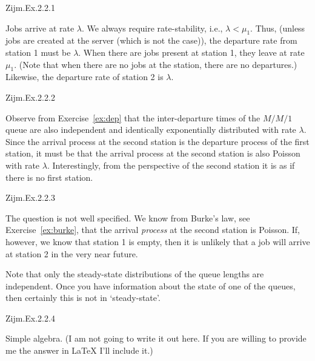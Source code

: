 \begin{exercise}[\faFlask]
Zijm.Ex.2.2.1
\begin{solution}
Jobs arrive at rate $\lambda$. We always require rate-stability, i.e.,  $\lambda<\mu_1$. Thus, (unless jobs are created at the server (which is not the case)),  the departure rate from station 1 must be $\lambda$. When there are jobs present at station 1, they leave at rate $\mu_1$. (Note that when there are no jobs at the station, there are no departures.) Likewise, the departure rate of station 2 is $\lambda$. 
\end{solution}
\end{exercise}

\begin{exercise}[\faFlask]
Zijm.Ex.2.2.2
\begin{solution}
  Observe from Exercise~\ref{ex:dep} that the inter-departure times of the $M/M/1$ queue are also independent and identically exponentially distributed with rate $\lambda$.
  Since the arrival process at the second station is the departure process of the first station, it must be that the arrival process at the second station is also Poisson with rate $\lambda$.
  Interestingly, from the perspective of the second station it is as if there is no first station.
\end{solution}
\end{exercise}



\begin{exercise}[\faFlask]
Zijm.Ex.2.2.3 
\begin{solution}
  The question is not well specified. We know from Burke's law, see Exercise~\ref{ex:burke}, that
  the arrival \emph{process} at the second station is Poisson.  If,
  however, we know that station 1 is empty, then it is unlikely that a
  job will arrive at station 2 in the very near future.

  Note that only the steady-state distributions of the queue lengths
  are independent. Once you have information about the state of one of
  the queues, then certainly this is not in `steady-state'.
\end{solution}
\end{exercise}

\begin{exercise}[\faFlask]
Zijm.Ex.2.2.4
\begin{solution}
  Simple algebra.  (I am not going to write it out here. If you are
  willing to provide me the answer in \LaTeX\/ I'll include it.)
\end{solution}
\end{exercise}

